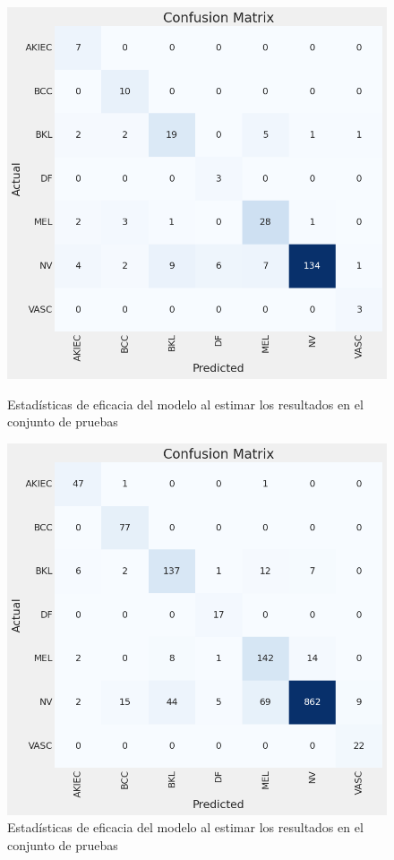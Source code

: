 \begin{figure}[ht]
    \centering
    \begin{minipage}{0.45\textwidth}
        \centering
        \includegraphics[width=\textwidth]{./Graphics/confussionmatrix_p1.png}
        \caption{Estadísticas de eficacia del modelo al estimar los resultados en el conjunto de pruebas}
        \label{fig:confussion_matrix_p1}
    \end{minipage}\hfill
    \begin{minipage}{0.45\textwidth}
        \centering
        \includegraphics[width=\textwidth]{./Graphics/confussionMatrix_p3.png}
        \caption{Estadísticas de eficacia del modelo al estimar los resultados en el conjunto de pruebas}
        \label{fig:confussion_matrix_p3}
    \end{minipage}
\end{figure}

